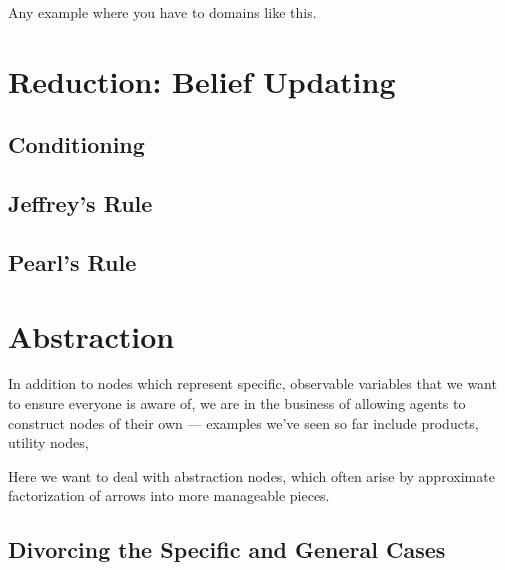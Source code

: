 \documentclass{article}
\begin{document}
	Any example where you have to domains like this.
	
	\section{Reduction: Belief Updating}
	\subsection{Conditioning}
	\subsection{Jeffrey's Rule}
	\subsection{Pearl's Rule}
	
	\section{Abstraction}
	In addition to nodes which represent specific, observable variables that we want to ensure everyone is aware of, we are in the business of allowing agents to construct nodes of their own --- examples we've seen so far include products, utility nodes, 
	
	Here we want to deal with abstraction nodes, which often arise by approximate factorization of arrows into more manageable pieces.
	
	\subsection{Divorcing the Specific and General Cases}
	

	
	
\end{document}
